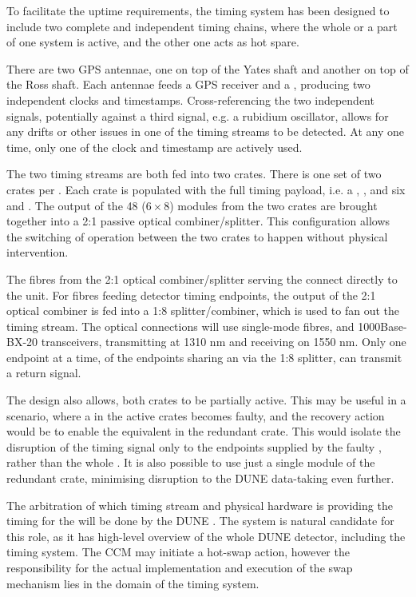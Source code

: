 \documentclass{dune}
\begin{document}
To facilitate the uptime requirements, the timing system has been designed to include two complete and independent timing chains, where the whole or a part of one system is active, and the other one acts as hot spare.

There are two GPS antennae, one on top of the Yates shaft and another on top of the Ross shaft. Each antennae feeds a GPS receiver and a , producing two independent  clocks and timestamps. Cross-referencing the two independent signals, potentially against a third signal, e.g. a rubidium oscillator, allows for any drifts or other issues in one of the  timing streams to be detected. At any one time, only one of the  clock and timestamp are actively used.

The two  timing streams are both fed into two  crates. There is one set of two  crates per . Each crate is populated with the full timing  payload, i.e. a , , and six  and . The output of the 48 ($6\times8$)  modules from the two  crates are brought together into a 2:1 passive optical combiner/splitter. This configuration allows the switching of operation between the two crates to happen without physical intervention. 

The fibres from the 2:1 optical combiner/splitter serving the  connect directly to the unit. For fibres feeding detector timing endpoints, the output of the 2:1 optical combiner is fed into a 1:8 splitter/combiner, which is used to fan out the  timing stream. The optical connections will use single-mode fibres, and 1000Base-BX-20  transceivers, transmitting at 1310 nm and receiving on 1550 nm. Only one endpoint at a time, of the endpoints sharing an  via the 1:8 splitter, can transmit a return signal.

The design also allows, both crates to be partially active. This may be useful in a scenario, where a  in the active crates becomes faulty, and the recovery action would be to enable the equivalent  in the redundant crate. This would isolate the disruption of the timing signal only to the endpoints supplied by the faulty , rather than the whole . It is also possible to use just a single  module of the redundant crate, minimising disruption to the DUNE data-taking even further.

The arbitration of which  timing stream and physical hardware is providing the timing for the  will be done by the DUNE . The  system is natural candidate for this role, as it has high-level overview of the whole DUNE detector, including the timing system. The CCM may initiate a hot-swap action, however the responsibility for the actual implementation and execution of the swap mechanism lies in the domain of the timing system.
\end{document}
